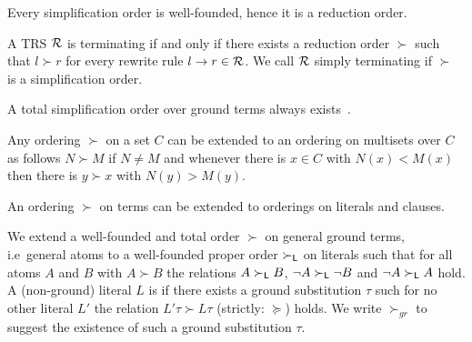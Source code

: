 \begin{lemma}\label{lem:siplifiaction:order:well:founded}
	Every simplification order is well-founded, hence it is a reduction order.
\end{lemma}

\begin{theorem}
	A TRS \( \mathcal{R} \) is terminating if and only if there exists a reduction order \( \succ \)
	such that \( l\succ r \) for every rewrite rule \( l\rightarrow r\in\mathcal{R} \).
	We call \( \mathcal{R} \) simply terminating if \( \succ \) is a simplification order.
\end{theorem}


\begin{lemma}
    A total simplification order
    over ground terms always exists~\cite{NR2001}.
\end{lemma}


\begin{lemma}
	Any ordering \( \succ \) on a set \( C \) can be extended to an ordering on multisets over \( C \)
	as follows \( N \succ M \) if \( N \neq M \)
	and whenever there is \( x\in C \) with \( N(x) < M(x) \)
	then there is \( y \succ x \) with \( N(y) > M(y) \).

	An ordering \( \succ \) on terms can be extended to orderings on literals and clauses.
\end{lemma}






	\begin{definition}\label{def:orders-on-literals}
		We extend a well-founded and total order \( \succ \) on general ground terms,
		i.e~general atoms to a well-founded proper order \( \succ_{\mathsf{L}} \)
		on literals such that for all atoms \( A \) and \( B \) with \( A\succ B \)
		the relations \( A\succ_{\mathsf{L}} B \),
		\( \lnot A\succ_{\mathsf{L}}\lnot B \) and
		\( \lnot A\succ_{\mathsf{L}} A \) hold.
		A (non-ground) literal \( L \) is  if there exists a ground substitution \( \tau \)
		such for no other literal \( L' \) the relation \( L'\tau\succ L\tau \) (strictly: \( \succcurlyeq \)) holds.
		We write \( \succ_{gr} \) to suggest the existence of such a ground substitution \( \tau \).
	\end{definition}



%





